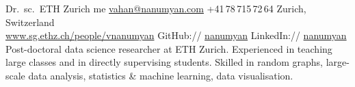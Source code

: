 \documentclass[]{vn-resume}
\begin{document}
%
%
{Dr.\ sc.\ ETH Zurich} %
{me} %
{%
%
\href{mailto:vahan@nanumyan.com}{vahan@nanumyan.com} \qquad%
+41\,78\,715\,72\,64 \qquad %
Zurich, Switzerland \qquad \\%
\href{http://www.sg.ethz.ch/people/vnanumyan}{www.sg.ethz.ch/people/vnanumyan} \qquad%
GitHub:// \href{https://github.com/nanumyan}{nanumyan}\qquad%
LinkedIn:// \href{https://www.linkedin.com/in/nanumyan/}{nanumyan}\qquad%
}{ %
 Post-doctoral data science researcher at ETH Zurich.  
 Experienced in teaching large classes and in directly supervising students.  
 Skilled in random graphs, large-scale data analysis, statistics \& machine learning, data visualisation.
}
\end{document}
